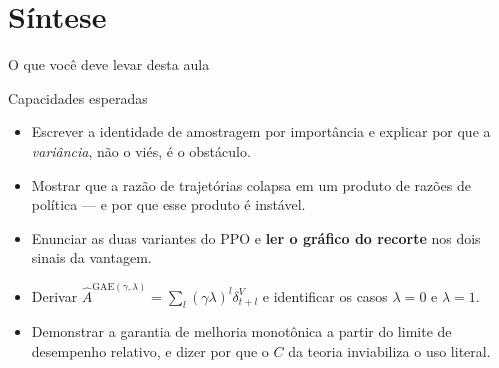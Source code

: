 \documentclass[aspectratio=169, 10pt]{beamer}
\newcommand{\Ahat}{\hat{A}}
\begin{document}
\section{Síntese}

\begin{frame}{O que você deve levar desta aula}

  \begin{defbox}{Capacidades esperadas}
    \begin{itemize}\setlength{\itemsep}{0.2ex}
      \item Escrever a identidade de amostragem por importância e explicar por que a
        \emph{variância}, não o viés, é o obstáculo.
      \item Mostrar que a razão de trajetórias colapsa em um produto de razões de
        política --- e por que esse produto é instável.
      \item Enunciar as duas variantes do PPO e \textbf{ler o gráfico do recorte}
        nos dois sinais da vantagem.
      \item Derivar $\Ahat^{\mathrm{GAE}(\gamma,\lambda)} = \sum_l (\gamma\lambda)^l\delta^V_{t+l}$
        e identificar os casos $\lambda = 0$ e $\lambda = 1$.
      \item Demonstrar a garantia de melhoria monotônica a partir do limite de
        desempenho relativo, e dizer por que o $C$ da teoria inviabiliza o uso literal.
    \end{itemize}
  \end{defbox}
\end{frame}
\end{document}
